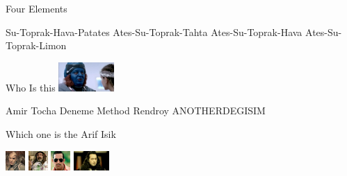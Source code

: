 \documentclass{exam}
\begin{document}
\begin{questions}
\question Four Elements\newline
\begin{oneparchoices}
\choice Su-Toprak-Hava-Patates
\choice Ates-Su-Toprak-Tahta
\choice Ates-Su-Toprak-Hava
\choice Ates-Su-Toprak-Limon
\end{oneparchoices}
\question Who Is this\newline
\includegraphics[height=3em]{rendroy2.jpg} \newline
\begin{oneparchoices}
\choice Amir Tocha
\choice Deneme Method
\choice Rendroy
\choice ANOTHERDEGISIM
\end{oneparchoices}
\question Which one is the Arif Isik\newline
\begin{oneparchoices}
\choice \includegraphics[height=2em]{216.jpg}
\choice \includegraphics[height=2em]{faruk.jpg}
\choice \includegraphics[height=2em]{arifisik.jpg}
\choice \includegraphics[height=2em]{komutanlogar.jpeg}
\end{oneparchoices}
\end{questions}
\end{document}
